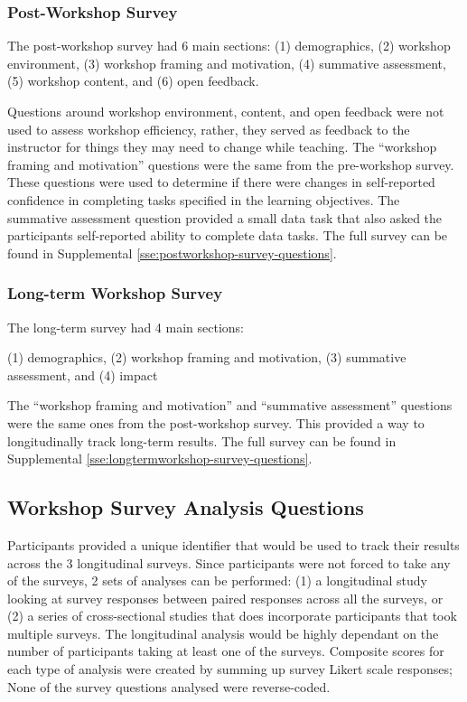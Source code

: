 \documentclass[030-workshop.tex]{subfiles}
\begin{document}
  \subsubsection{Post-Workshop Survey}

      The post-workshop survey had 6 main sections:
      (1) demographics,
      (2) workshop environment,
      (3) workshop framing and motivation,
      (4) summative assessment,
      (5) workshop content, and
      (6) open feedback.

      Questions around workshop environment, content, and open feedback
      were not used to assess workshop efficiency,
      rather, they served as feedback to the instructor for things they may need to change while teaching.
      The ``workshop framing and motivation'' questions were the same from the pre-workshop survey.
      These questions were used to determine if there were changes in self-reported confidence in
      completing tasks specified in the learning objectives.
      The summative assessment question provided a small data task that also asked
      the participants self-reported ability to complete data tasks.
      The full survey can be found in Supplemental \ref{sse:postworkshop-survey-questions}.

  \subsubsection{Long-term Workshop Survey}

    The long-term survey had 4 main sections:

    (1) demographics,
    (2) workshop framing and motivation,
    (3) summative assessment, and
    (4) impact

    The ``workshop framing and motivation'' and ``summative assessment'' questions were
    the same ones from the post-workshop survey.
    This provided a way to longitudinally track long-term results.
    The full survey can be found in Supplemental \ref{sse:longtermworkshop-survey-questions}.

  \subsection{Workshop Survey Analysis Questions}

    Participants provided a unique identifier that would be used to track their results across the 3 longitudinal surveys.
    Since participants were not forced to take any of the surveys,
    2 sets of analyses can be performed:
    (1) a longitudinal study looking at survey responses between paired responses across all the surveys, or
    (2) a series of cross-sectional studies that does incorporate participants that took multiple surveys.
    The longitudinal analysis would be highly dependant on the number of participants taking at least one of the surveys.
    Composite scores for each type of analysis were created by summing up survey Likert scale responses;
    None of the survey questions analysed were reverse-coded.
\end{document}
